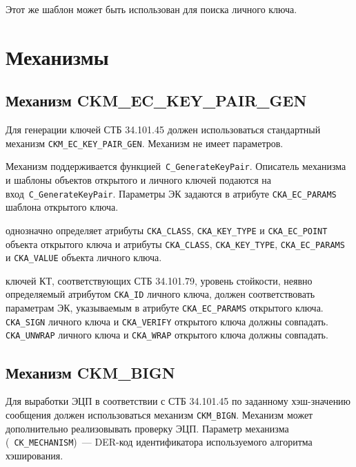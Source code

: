 Этот же шаблон может быть использован для поиска личного ключа.

\section{Механизмы}

\subsection{Механизм CKM\_EC\_KEY\_PAIR\_GEN}


Для генерации ключей СТБ 34.101.45 должен использоваться стандартный 
механизм \verb|CKM_EC_KEY_PAIR_GEN|. Механизм не имеет параметров. 

Механизм поддерживается функцией~\verb|C_GenerateKeyPair|. 
%
Описатель механизма и шаблоны объектов открытого и личного
ключей подаются на вход~\verb|C_GenerateKeyPair|. Параметры ЭК задаются в 
атрибуте \verb|CKA_EC_PARAMS| шаблона открытого ключа.

 однозначно определяет атрибуты
\verb|CKA_CLASS|, \verb|CKA_KEY_TYPE| и \verb|CKA_EC_POINT|
объекта открытого ключа и атрибуты
\verb|CKA_CLASS|, \verb|CKA_KEY_TYPE|, \verb|CKA_EC_PARAMS| и \verb|CKA_VALUE| объекта личного ключа.


 ключей КТ, соответствующих СТБ 34.101.79,
уровень стойкости, неявно определяемый атрибутом \verb|CKA_ID| личного ключа,
должен соответствовать параметрам ЭК, указываемым в атрибуте \verb|CKA_EC_PARAMS| открытого ключа.  \verb|CKA_SIGN| личного ключа и \verb|CKA_VERIFY| открытого ключа должны совпадать.  \verb|CKA_UNWRAP| личного ключа и \verb|CKA_WRAP| открытого ключа должны совпадать.

\subsection{Механизм CKM\_BIGN}

Для выработки ЭЦП в соответствии с СТБ 34.101.45 по заданному хэш-значению 
сообщения должен использоваться механизм \verb|CKM_BIGN|. Механизм может 
дополнительно реализовывать проверку ЭЦП. 
%
Параметр механизма (~\verb|CK_MECHANISM|)~--- DER-код идентификатора используемого 
алгоритма хэширования.


